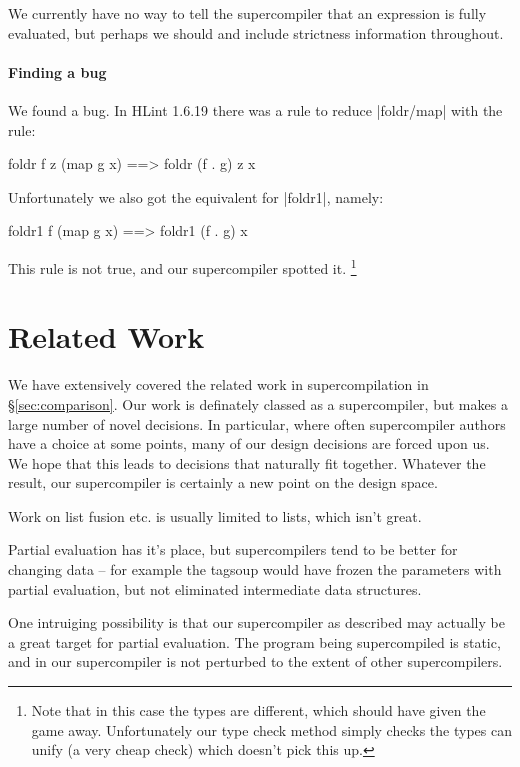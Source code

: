 \documentclass[draft]{sigplanconf}
\begin{document}
We currently have no way to tell the supercompiler that an expression is fully evaluated, but perhaps we should and include strictness information throughout.

\paragraph{Finding a bug}

We found a bug. In HLint 1.6.19 there was a rule to reduce |foldr/map| with the rule:

\begin{code}
foldr f z (map g x) ==> foldr (f . g) z x
\end{code}

Unfortunately we also got the equivalent for |foldr1|, namely:

\begin{code}
foldr1 f (map g x) ==> foldr1 (f . g) x
\end{code}

This rule is not true, and our supercompiler spotted it. \footnote{Note that in this case the types are different, which should have given the game away. Unfortunately our type check method simply checks the types can unify (a very cheap check) which doesn't pick this up.}

\section{Related Work}

We have extensively covered the related work in supercompilation in \S\ref{sec:comparison}. Our work is definately classed as a supercompiler, but makes a large number of novel decisions. In particular, where often supercompiler authors have a choice at some points, many of our design decisions are forced upon us. We hope that this leads to decisions that naturally fit together. Whatever the result, our supercompiler is certainly a new point on the design space.

Work on list fusion etc. is usually limited to lists, which isn't great.

Partial evaluation has it's place, but supercompilers tend to be better for changing data -- for example the tagsoup would have frozen the parameters with partial evaluation, but not eliminated intermediate data structures.

One intruiging possibility is that our supercompiler as described may actually be a great target for partial evaluation. The program being supercompiled is static, and in our supercompiler is not perturbed to the extent of other supercompilers.
\end{document}
